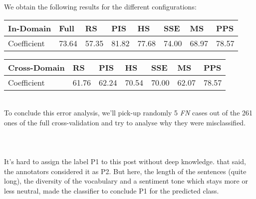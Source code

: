We obtain the following results for the different configurations:
\begin{table}[h]
\centering
\begin{tabular}{|l|l|l|l|l|l|l|l|}
\hline
In-Domain   & Full  & RS    & PIS   & HS    & SSE   & MS    & PPS   \\ \hline
Coefficient & 73.64 & 57.35 & 81.82 & 77.68 & 74.00 & 68.97 & 78.57 \\ \hline
\end{tabular}
\end{table}
\begin{table}[h]
\centering
\begin{tabular}{|l|l|l|l|l|l|l|}
\hline
Cross-Domain & RS    & PIS   & HS    & SSE   & MS    & PPS   \\ \hline
Coefficient  & 61.76 & 62.24 & 70.54 & 70.00 & 62.07 & 78.57 \\ \hline
\end{tabular}
\end{table}
\\
To conclude this error analysis, we'll pick-up randomly 5 \emph{FN} cases out of the 261 ones of the full cross-validation and try to analyse why they were misclassified.
\\
\\
\\
\\
It's hard to assign the label P1 to this post without deep knowledge. that said, the annotators considered it as P2. But here, the length of the sentences (quite long), the diversity of the vocabulary and a sentiment tone which stays more or less neutral, made the classifier to conclude P1 for the predicted class.
\\
\\
